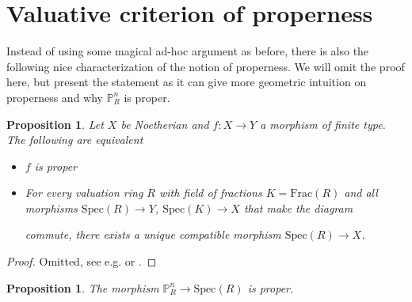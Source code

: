 \documentclass{scrartcl}
\renewcommand{\P}{\mathbb{P}}
\newcommand{\Spec}{\mathrm{Spec}}
\newcommand{\Frac}{\mathrm{Frac}}
\newcommand{\citestacks}[1]{\cite[\href{https://stacks.math.columbia.edu/tag/#1}{Tag #1}]{stacks}}
\newtheorem{prop}[subsection]{Proposition}
\theoremstyle{definition}
\begin{document}
\section{Valuative criterion of properness}
\label{sec:valuative_criterion_properness}
Instead of using some magical ad-hoc argument as before, there is also the following nice characterization of the notion of properness.
We will omit the proof here, but present the statement as it can give more geometric intuition on properness and why $\P_R^n$ is proper.
\begin{prop}
    \label{prop:valuative_criterion_properness}
    Let $X$ be Noetherian and $f: X \to Y$ a morphism of finite type.
    The following are equivalent
    \begin{itemize}
        \item $f$ is proper
        \item For every valuation ring $R$ with field of fractions $K = \Frac(R)$ and all morphisms $\Spec(R) \to Y$, $\Spec(K) \to X$ that make the diagram
        \begin{center}
        \end{center}
        commute, there exists a unique compatible morphism $\Spec(R) \to X$.
    \end{itemize}
\end{prop}
\begin{proof}
    Omitted, see e.g. \cite[II.4.7]{hartshorne} or \citestacks{0BX5}.
\end{proof}
\begin{prop}
    \label{prop:projective_space_proper_alternative_proof}
    The morphism $\P_R^n \to \Spec(R)$ is proper.
\end{prop}
\end{document}
